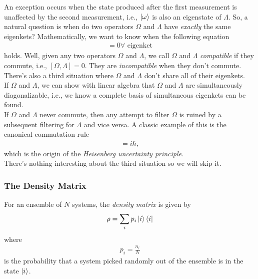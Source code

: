 \documentclass{book}
\theoremstyle{definition}
\newcommand{\f}[2]{\frac{#1}{#2}}
\begin{document}
An exception occurs when the state produced after the first measurement is unaffected by the second measurement, i.e., $\ket{\omega}$ is also an eigenstate of $\Lambda$. So, a natural question is when do two operators $\Omega$ and $\Lambda$ have \textit{exactly} the same eigenkets? Mathematically, we want to know when the following equation 
\begin{align}
[\Omega, \Lambda] = 0 \forall \text{ eigenket}
\end{align}
holds. Well, given any two operators $\Omega$ and $\Lambda$, we call $\Omega$ and $\Lambda$ \textit{compatible} if they commute, i.e., $[\Omega, \Lambda] = 0$. They are \textit{incompatible} when they don't commute. There's also a third situation where $\Omega$ and $\Lambda$ don't share all of their eigenkets. \\

If $\Omega$ and $\Lambda$, we can show with linear algebra that $\Omega$ and $\Lambda$ are simultaneously diagonalizable, i.e., we know a complete basis of simultaneous eigenkets can be found. \\

If $\Omega$ and $\Lambda$ never commute, then any attempt to filter $\Omega$ is ruined by a subsequent filtering for $\Lambda$ and vice versa. A classic example of this is the canonical commutation rule
\begin{align}
[\hat{x}, \hat{p}] = i\hbar,
\end{align}
which is the origin of the \textit{Heisenberg uncertainty principle}. \\

There's nothing interesting about the third situation so we will skip it. 






\subsubsection{The Density Matrix}

For an ensemble of $N$ systems, the \textit{density matrix} is given by
\begin{align}
\rho = \sum_i p_i \ket{i}\bra{i}
\end{align}
where
\begin{align}
p_i = \f{n_i}{N}
\end{align}
is the probability that a system picked randomly out of the ensemble is in the state $\ket{i}$.\\
\end{document}
